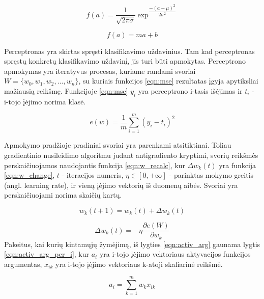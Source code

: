 \begin{equation}
	\label{eqn:gaussian}
	f(a) = \dfrac{1}{\sqrt{2\pi\sigma}} \exp^{\dfrac{-(a - \mu)^2}{2\sigma^2}}
\end{equation}

\begin{equation}
	\label{eqn:linear}
	f(a) = ma + b
\end{equation}

Perceptronas yra skirtas spręsti klasifikavimo uždavinius. Tam kad perceptronas spręstų konkretų klasifikavimo uždavinį, jis turi būti apmokytas. Perceptrono apmokymas yra iteratyvus procesas, kuriame randami svoriai $W = \{w_{0}, w_{1}, w_{2}, ..., w_{n}\}$, su kuriais funkcijos \ref{eqn:mse} rezultatas įgyja apytiksliai mažiausią reikšmę. Funkcijoje \ref{eqn:mse} $y_i$ yra perceptrono i-tasis išėjimas ir $t_i$ - i-tojo įėjimo norima klasė.

\begin{equation}
	\label{eqn:mse}
	e(w) = \dfrac{1}{m}\sum_{i=1}^{m}(y_i - t_i)^2
\end{equation}

Apmokymo pradžioje pradiniai svoriai yra parenkami atsitiktinai. Toliau gradientinio nusileidimo algoritmu judant antigradiento kryptimi, svorių reikšmės perskaičiuojamos naudojantis funkcija \ref{eqn:w_recalc}, kur $\Delta w_k(t)$ yra funkcija \ref{eqn:w_change}, $t$ - iteracijos numeris, $\eta \in [0, +\infty]$ - parinktas mokymo greitis (angl. learning rate), ir vieną įėjimo vektorių iš duomenų aibės. Svoriai yra perskaičiuojami norima skaičių kartų.

\begin{equation}
	\label{eqn:w_recalc}
	w_k(t + 1) = w_k(t) + \Delta w_k(t)
\end{equation}

\begin{equation}
	\label{eqn:w_change}
	\Delta w_k(t) = - \eta \dfrac{\partial e(W)}{\partial w_k}
\end{equation}
Pakeitus, kai kurių kintamųjų žymėjimą, iš lygties \ref{eqn:activ_arg} gaunama lygtis \ref{eqn:activ_arg_per_i}, kur $a_i$ yra i-tojo įėjimo vektoriaus aktyvacijos funkcijos argumentas, $x_{ik}$ yra i-tojo įėjimo vektoriaus k-atoji skaliarinė reikšmė.

\begin{equation}
	\label{eqn:activ_arg_per_i}
	a_i = \sum_{k = 1}^{m} w_{k}x_{ik}
\end{equation}

